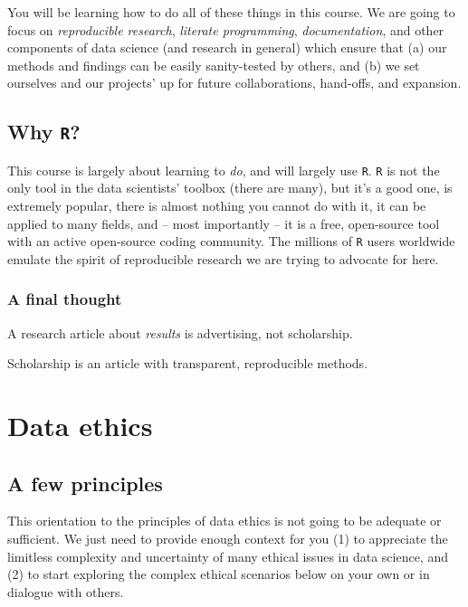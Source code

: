 \documentclass[
]{book}
\begin{document}
You will be learning how to do all of these things in this course. We are going to focus on \emph{reproducible research}, \emph{literate programming}, \emph{documentation}, and other components of data science (and research in general) which ensure that (a) our methods and findings can be easily sanity-tested by others, and (b) we set ourselves and our projects' up for future collaborations, hand-offs, and expansion.

\hypertarget{why-r}{%
\section*{\texorpdfstring{Why \texttt{R}?}{Why R?}}\label{why-r}}

This course is largely about learning to \emph{do}, and will largely use \texttt{R}. \texttt{R} is not the only tool in the data scientists' toolbox (there are many), but it's a good one, is extremely popular, there is almost nothing you cannot do with it, it can be applied to many fields, and -- most importantly -- it is a free, open-source tool with an active open-source coding community. The millions of \texttt{R} users worldwide emulate the spirit of reproducible research we are trying to advocate for here.

\hypertarget{a-final-thought}{%
\subsection*{A final thought}\label{a-final-thought}}

A research article about \emph{results} is advertising, not scholarship.

Scholarship is an article with transparent, reproducible methods.

\hypertarget{data-ethics}{%
\chapter{Data ethics}\label{data-ethics}}

\hypertarget{a-few-principles}{%
\section*{A few principles}\label{a-few-principles}}

This orientation to the principles of data ethics is not going to be adequate or sufficient. We just need to provide enough context for you (1) to appreciate the limitless complexity and uncertainty of many ethical issues in data science, and (2) to start exploring the complex ethical scenarios below on your own or in dialogue with others.
\end{document}
